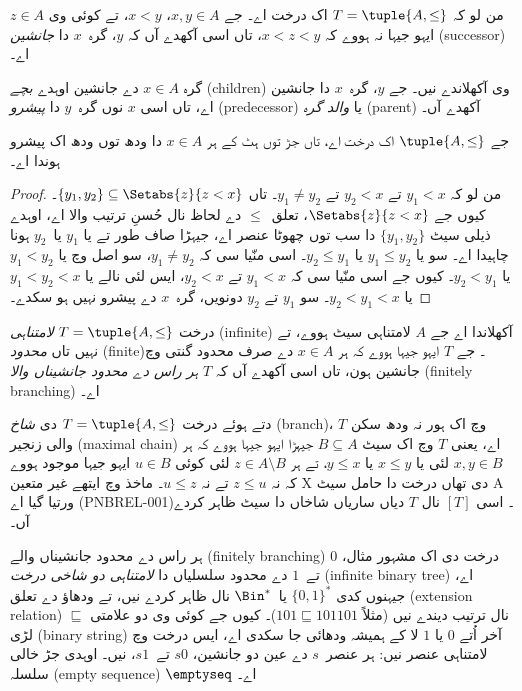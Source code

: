 \documentclass[../../../include/open-logic-section]{subfiles}
\begin{document}
\begin{defn}
من لو کہ $T = \tuple{A, \le}$ اک درخت اے۔ جے $x,y \in A$، $x < y$،
تے کوئی وی $z \in A$ ایہو جیہا نہ ہووے کہ $x < z < y$، تاں اسی آکھدے
آں کہ $y$، گرہ~$x$ دا \emph{جانشین} (successor) اے۔
\end{defn}

گرہ $x \in A$ دے جانشین اوہدے \emph{بچے} (children) وی آکھلاندے نیں۔
جے $y$، گرہ~$x$ دا جانشین اے، تاں اسی $x$ نوں گرہ~$y$ دا
\emph{پیشرو} (predecessor) یا \emph{والد گرہ} (parent) آکھدے آں۔

\begin{prop}
جے $\tuple{A,\le}$ اک درخت اے، تاں جڑ توں ہٹ کے ہر $x \in A$ دا ودھ
توں ودھ اک پیشرو ہوندا اے۔
\end{prop}

\begin{proof}
  من لو کہ $y_1 < x$ تے $y_2 < x$ تے $y_1 \neq y_2$۔ تاں $\{y_1,
  y_2\} \subseteq \Setabs{z}{z<x}$۔ کیوں جے $\Setabs{z}{z<x}$،
  تعلق~$\le$ دے لحاظ نال حُسنِ ترتیب والا اے، اوہدے ذیلی سیٹ
  $\{y_1, y_2\}$ دا سب توں چھوٹا عنصر اے، جیہڑا صاف طور تے یا $y_1$
  یا~$y_2$ ہونا چاہیدا اے۔ سو یا $y_1 \le y_2$ یا $y_2 \le y_1$۔ اسی
  منّیا سی کہ $y_1 \neq y_2$، سو اصل وچ یا $y_1 < y_2$ یا $y_2 < y_1$۔
  کیوں جے اسی منّیا سی کہ $y_1 < x$ تے $y_2 < x$، ایس لئی نالے یا
  $y_1 < y_2 < x$ یا $y_2 < y_1 < x$۔ سو $y_1$ تے $y_2$ دونویں،
  گرہ~$x$ دے پیشرو نہیں ہو سکدے۔
\end{proof}

\begin{defn}
درخت $T = \tuple{A, \le}$ \emph{لامتناہی} (infinite) آکھلاندا اے جے
$A$ لامتناہی سیٹ ہووے، تے نہیں تاں \emph{محدود} (finite)۔ جے $T$ ایہو
جیہا ہووے کہ ہر $x \in A$ دے صرف محدود گنتی وچ جانشین ہون، تاں اسی
آکھدے آں کہ $T$ \emph{ہر راس دے محدود جانشیناں والا} (finitely
branching) اے۔
\end{defn}

\begin{defn}
دتے ہوئے درخت $T = \tuple{A, \le}$ دی \emph{شاخ} (branch)، $T$ وچ اک
ہور نہ ودھ سکن والی زنجیر (maximal chain) اے، یعنی $T$ وچ اک سیٹ
$B \subseteq A$ جیہڑا ایہو جیہا ہووے کہ ہر $x, y \in B$ لئی یا
$x \le y$ یا $y \le x$، تے ہر $z \in A \setminus B$ لئی کوئی
$u \in B$ ایہو جیہا موجود ہووے کہ نہ $z \le u$ تے نہ $u \le z$۔
ماخذ وچ ایتھے غیر متعین X دی تھاں درخت دا حامل سیٹ A ورتیا گیا اے
(PNBREL-001)۔
%
اسی $[T]$ نال $T$ دیاں ساریاں شاخاں دا سیٹ ظاہر کردے آں۔
\end{defn}

\begin{ex}
ہر راس دے محدود جانشیناں والے (finitely branching) درخت دی اک مشہور
مثال، $0$ تے~$1$ دے محدود سلسلیاں دا \emph{لامتناہی دو شاخی درخت}
(infinite binary tree) اے، جیہنوں کدی $\{0,1\}^*$ یا~$\Bin^*$ نال
ظاہر کردے نیں، تے ودھاؤ دے تعلق (extension relation) $\sqsubseteq$
نال ترتیب دیندے نیں (مثلاً $101 \sqsubseteq 101101$)۔ کیوں جے کوئی وی
دو علامتی لڑی (binary string) آخر اُتے $0$ یا $1$ لا کے ہمیشہ ودھائی
جا سکدی اے، ایس درخت وچ لامتناہی عنصر نیں: ہر عنصر~$s$ دے عین دو
جانشین، $s0$ تے~$s1$، نیں۔ اوہدی جڑ خالی سلسلہ (empty sequence)
$\emptyseq$ اے۔
\end{ex}
\end{document}

